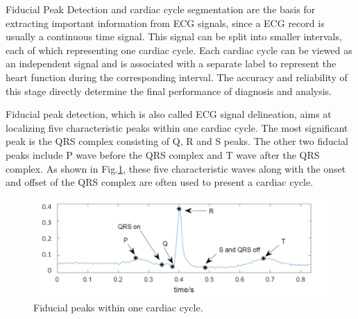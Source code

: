 Fiducial Peak Detection and cardiac cycle segmentation are the basis for extracting important information from ECG signals, since a ECG record is usually a continuous time signal. This signal can be split into smaller intervals, each of which representing one cardiac cycle. Each cardiac cycle can be viewed as an independent signal and is associated with a separate label to represent the heart function during the corresponding interval. %
The accuracy and reliability of this stage directly determine the final performance of diagnosis and analysis. 

Fiducial peak detection, which is also called ECG signal delineation, aims at localizing five characteristic peaks within one cardiac cycle. The most significant peak is the QRS complex consisting of Q, R and S peaks. The other two fiducial peaks include P wave before the QRS complex and T wave after the QRS complex. As shown in Fig.\ref{fig:fiducial_peaks}, these five characteristic waves along with the onset and offset of the QRS complex are often used to present a cardiac cycle.

 \begin{figure}[thpb]
 	\centering
 	\includegraphics[scale=0.7]{Fig/fiducial_peaks2.png}  
 	\caption{Fiducial peaks within one cardiac cycle.}
 	\label{fig:fiducial_peaks}
 \end{figure}
 
